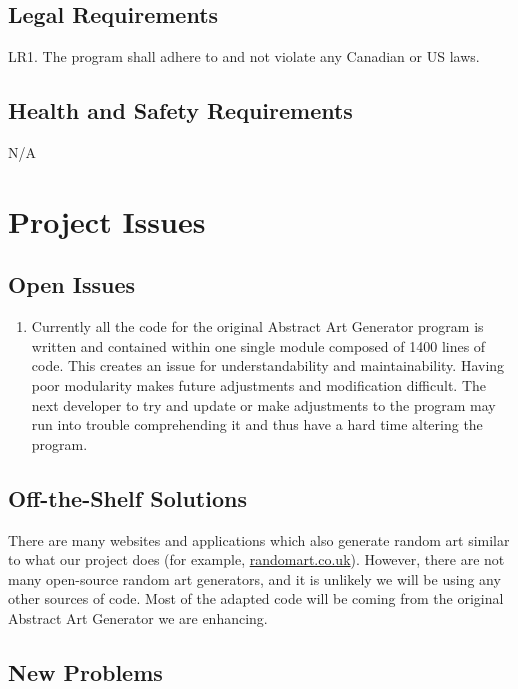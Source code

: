 \documentclass[12pt, titlepage]{article}
\begin{document}
\subsection{Legal Requirements}
LR1. The program shall adhere to and not violate any Canadian or US laws.

\subsection{Health and Safety Requirements}
N/A

\section{Project Issues}

\subsection{Open Issues}

\begin{enumerate}[start=1,label={Issue \arabic*.}]
    \item Currently all the code for the original Abstract Art Generator program is written and contained within one single module composed of 1400 lines of code. This creates an issue for understandability and maintainability. Having poor modularity makes future adjustments and modification difficult. The next developer to try and update or make adjustments to the program may run into trouble comprehending it and thus have a hard time altering the program. 
\end{enumerate}

\subsection{Off-the-Shelf Solutions}

There are many websites and applications which also generate random art similar to what our project does (for example, \href{https://www.randomart.co.uk/random-art-generator.aspx}{randomart.co.uk}). However, there are not many open-source random art generators, and it is unlikely we will be using any other sources of code. Most of the adapted code will be coming from the original Abstract Art Generator we are enhancing.

\subsection{New Problems}
\end{document}

